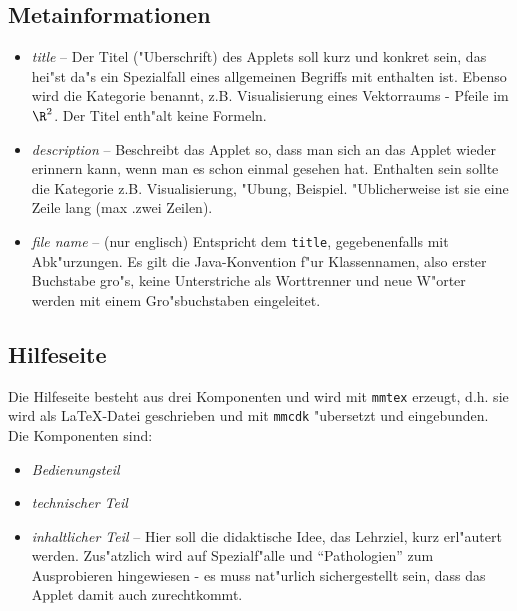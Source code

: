\documentclass[a4paper,12pt]{article}
\begin{document}
\subsection{Metainformationen}
\begin{itemize}
\item \textit{title} -- Der Titel ("Uberschrift) des Applets soll kurz und konkret sein, das
  hei"st da"s ein Spezialfall eines allgemeinen Begriffs mit enthalten ist. Ebenso wird die
  Kategorie benannt, z.B. Visualisierung eines Vektorraums - Pfeile im $\R^2$. Der Titel
  enth"alt keine Formeln.
\item \textit{description} -- Beschreibt das Applet so, dass man sich an das Applet wieder
  erinnern kann, wenn man es schon einmal gesehen hat. Enthalten sein sollte die Kategorie
  z.B. Visualisierung, "Ubung, Beispiel. "Ublicherweise ist sie eine Zeile lang (max .zwei
  Zeilen).
\item \textit{file name} -- (nur englisch) Entspricht dem \verb|title|, gegebenenfalls mit
  Abk"urzungen. Es gilt die Java-Konvention f"ur Klassennamen, also erster Buchstabe gro"s,
  keine Unterstriche als Worttrenner und neue W"orter werden mit einem Gro"sbuchstaben
  eingeleitet.
\end{itemize}
\subsection{Hilfeseite}
Die Hilfeseite besteht aus drei Komponenten und wird mit \verb|mmtex| erzeugt, d.h. sie wird
als LaTeX-Datei geschrieben und mit \verb|mmcdk| "ubersetzt und eingebunden. Die
Komponenten sind:
\begin{itemize}
\item \textit{Bedienungsteil}
\item \textit{technischer Teil}
\item \textit{inhaltlicher Teil} -- Hier soll die didaktische Idee, das Lehrziel, kurz
  erl"autert werden. Zus"atzlich wird auf Spezialf"alle und "`Pathologien"' zum Ausprobieren
  hingewiesen - es muss nat"urlich sichergestellt sein, dass das Applet damit auch
  zurechtkommt.
\end{itemize}
\end{document}
